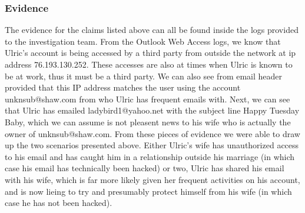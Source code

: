 \documentclass[paper=a4, fontsize=11pt]{scrartcl} %
\numberwithin{equation}{section} %
\numberwithin{figure}{section} %
\numberwithin{table}{section} %
\begin{document}
\subsubsection{Evidence}
The evidence for the claims listed above can all be found inside the logs provided to the
investigation team. From the Outlook Web Access logs, we know that Ulric's account is being
accessed by a third party from outside the network at ip address 76.193.130.252. These accesses
are also at times when Ulric is known to be at work, thus it must be a third party. We can 
also see from email header provided that this IP address matches the user using the account
unknsub@shaw.com from who Ulric has frequent emails with. Next, we can see that Ulric has
emailed ladybird1@yahoo.net with the subject line Happy Tuesday Baby, which we can assume
is not pleasent news to his wife who is actually the owner of unknsub@shaw.com. From these
pieces of evidence we were able to draw up the two scenarios presented above. Either Ulric's
wife has unauthorized access to his email and has caught him in a relationship outside his
marriage (in which case his email has technically been hacked) or two, Ulric has shared
his email with his wife, which is far more likely given her frequent activities on his account,
and is now lieing to try and presumably protect himself from his wife (in which case he has
not been hacked). 
\end{document}
